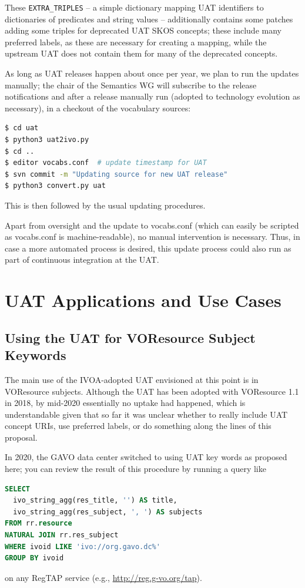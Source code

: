 \documentclass[11pt,a4paper]{ivoa}
\begin{document}
These \verb|EXTRA_TRIPLES| -- a simple dictionary mapping UAT
identifiers to dictionaries of predicates and string values --
additionally contains some patches adding some triples for deprecated
UAT SKOS concepts; these include many preferred labels, as these are
necessary for creating a mapping, while the upstream UAT does not contain
them for many of the deprecated concepts.

As long as UAT releases happen about once per year, we plan to run the
updates manually; the chair of the Semantics WG will subscribe to the
release notifications and after a release manually run (adopted to
technology evolution as necessary), in a checkout of the vocabulary
sources:

\begin{lstlisting}[language=sh]
$ cd uat
$ python3 uat2ivo.py
$ cd ..
$ editor vocabs.conf  # update timestamp for UAT
$ svn commit -m "Updating source for new UAT release"
$ python3 convert.py uat
\end{lstlisting}

This is then followed by the usual updating procedures.

Apart from oversight and the update to vocabs.conf (which can easily be
scripted as vocabs.conf is machine-readable),  no manual intervention is
necessary.  Thus, in case a more automated process is desired, this
update process could also run as part of continuous integration at the
UAT.

\section{UAT Applications and Use Cases}

\subsection{Using the UAT for VOResource Subject Keywords}

The main use of the IVOA-adopted UAT envisioned at this point is in
VOResource subjects.  Although the UAT has been adopted with VOResource
1.1 in 2018, by mid-2020 essentially no uptake had happened, which is
understandable given that so far it was unclear whether to really include UAT
concept URIs, use preferred labels, or do something along the
lines of this proposal.

In 2020, the GAVO data center switched to using UAT key words as
proposed here; you can review the result of this procedure by running
a query like
\begin{lstlisting}[language=SQL]
SELECT 
  ivo_string_agg(res_title, '') AS title,
  ivo_string_agg(res_subject, ', ') AS subjects
FROM rr.resource
NATURAL JOIN rr.res_subject
WHERE ivoid LIKE 'ivo://org.gavo.dc%'
GROUP BY ivoid
\end{lstlisting}
on any RegTAP service (e.g., \url{http://reg.g-vo.org/tap}).
\end{document}
